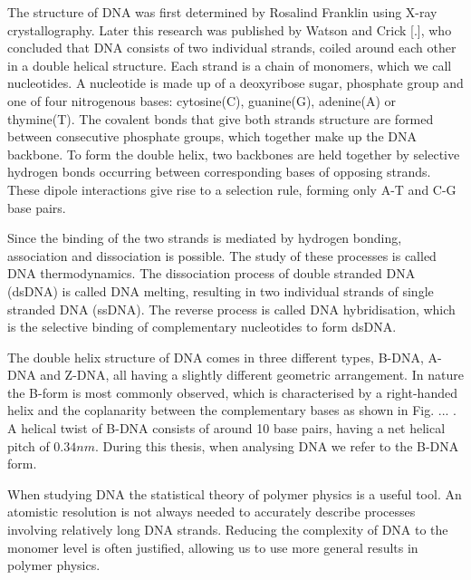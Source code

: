 The structure of DNA was first determined by Rosalind Franklin using X-ray
crystallography. Later this research was published by Watson and Crick [.], who concluded
that DNA consists of two individual strands, coiled around each other in a double helical
structure. Each strand is a chain of monomers, which we call nucleotides. A nucleotide is
made up of a
deoxyribose sugar, phosphate group and one of four nitrogenous bases: cytosine(C),
guanine(G), adenine(A) or thymine(T). The covalent bonds that give both strands structure
are formed between consecutive phosphate groups, which together make up the DNA backbone.
To form the double helix, two backbones are held together by
selective hydrogen bonds occurring between corresponding bases of opposing strands. These
dipole interactions give rise to a selection rule, forming only A-T and C-G base pairs.

Since the binding of the two strands is mediated by hydrogen bonding, association and
dissociation is possible. The study of these processes is called DNA thermodynamics. The
dissociation process of double stranded DNA (dsDNA) is called DNA melting, resulting in
two individual strands of single stranded DNA (ssDNA). The reverse process is called DNA
hybridisation, which is the selective binding of complementary nucleotides to form dsDNA.

The double helix structure of DNA comes in three different types, B-DNA, A-DNA and Z-DNA,
all having a slightly different geometric arrangement. In nature the B-form is most
commonly observed, which is characterised by a right-handed helix and the coplanarity
between the complementary bases as shown in Fig. ... . A helical twist of B-DNA consists
of around 10 base pairs, having a net helical pitch of $0.34 nm$. During this thesis,
when analysing DNA we refer to the B-DNA form.

When studying DNA the statistical theory of polymer physics is a useful tool. An
atomistic resolution is not always needed to accurately describe processes involving
relatively long DNA strands.  Reducing the complexity of DNA to the monomer level is
often justified, allowing us to use more general results in polymer physics.


